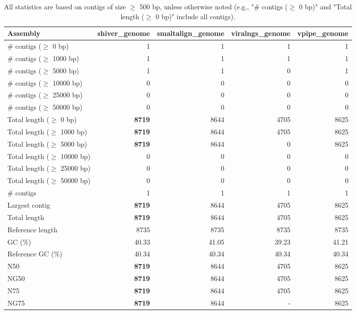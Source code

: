 \documentclass[12pt,a4paper]{article}
\begin{document}
\begin{table}[ht]
\begin{center}
\caption{All statistics are based on contigs of size $\geq$ 500 bp, unless otherwise noted (e.g., "\# contigs ($\geq$ 0 bp)" and "Total length ($\geq$ 0 bp)" include all contigs).}
\begin{tabular}{|l*{4}{|r}|}
\hline
Assembly & shiver\_genome & smaltalign\_genome & viralngs\_genome & vpipe\_genome \\ \hline
\# contigs ($\geq$ 0 bp) & 1 & 1 & 1 & 1 \\ \hline
\# contigs ($\geq$ 1000 bp) & 1 & 1 & 1 & 1 \\ \hline
\# contigs ($\geq$ 5000 bp) & 1 & 1 & 0 & 1 \\ \hline
\# contigs ($\geq$ 10000 bp) & 0 & 0 & 0 & 0 \\ \hline
\# contigs ($\geq$ 25000 bp) & 0 & 0 & 0 & 0 \\ \hline
\# contigs ($\geq$ 50000 bp) & 0 & 0 & 0 & 0 \\ \hline
Total length ($\geq$ 0 bp) & {\bf 8719} & 8644 & 4705 & 8625 \\ \hline
Total length ($\geq$ 1000 bp) & {\bf 8719} & 8644 & 4705 & 8625 \\ \hline
Total length ($\geq$ 5000 bp) & {\bf 8719} & 8644 & 0 & 8625 \\ \hline
Total length ($\geq$ 10000 bp) & 0 & 0 & 0 & 0 \\ \hline
Total length ($\geq$ 25000 bp) & 0 & 0 & 0 & 0 \\ \hline
Total length ($\geq$ 50000 bp) & 0 & 0 & 0 & 0 \\ \hline
\# contigs & 1 & 1 & 1 & 1 \\ \hline
Largest contig & {\bf 8719} & 8644 & 4705 & 8625 \\ \hline
Total length & {\bf 8719} & 8644 & 4705 & 8625 \\ \hline
Reference length & 8735 & 8735 & 8735 & 8735 \\ \hline
GC (\%) & 40.33 & 41.05 & 39.23 & 41.21 \\ \hline
Reference GC (\%) & 40.34 & 40.34 & 40.34 & 40.34 \\ \hline
N50 & {\bf 8719} & 8644 & 4705 & 8625 \\ \hline
NG50 & {\bf 8719} & 8644 & 4705 & 8625 \\ \hline
N75 & {\bf 8719} & 8644 & 4705 & 8625 \\ \hline
NG75 & {\bf 8719} & 8644 & - & 8625 \\ \hline

\end{tabular}
\end{center}
\end{table}
\end{document}
